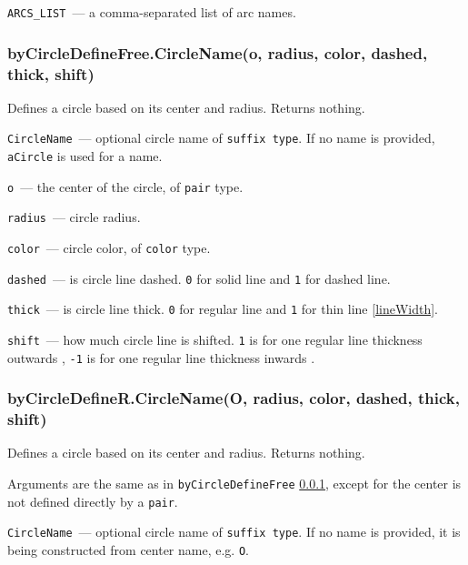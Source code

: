 	\texttt{ARCS\_LIST}~— a comma-separated list of arc names.


\subsubsection{byCircleDefineFree.CircleName(o, radius, color, dashed, thick, shift)}\label{byCircleDefineFree}
	
	Defines a circle based on its center and radius. Returns nothing.
	
	
	\texttt{CircleName}~— optional circle name of \texttt{suffix type}. If no name is provided, \texttt{aCircle} is used for a name.
	
	\texttt{o}~— the center of the circle, of \texttt{pair} type.
	
	\texttt{radius}~— circle radius.
	
	\texttt{color}~— circle color, of \texttt{color} type.
	
	\texttt{dashed}~— is circle line dashed. \texttt{0} for solid line and \texttt{1} for dashed line.
	
	\texttt{thick}~— is circle line thick. \texttt{0} for regular line and \texttt{1} for thin line \ref{lineWidth}.
	
	\texttt{shift}~— how much circle line is shifted. \texttt{1} is for one regular line thickness outwards
	, \texttt{-1} is for one regular line thickness inwards
	.

\subsubsection{byCircleDefineR.CircleName(O, radius, color, dashed, thick, shift)}\label{byCircleDefineR}
	
	Defines a circle based on its center and radius. Returns nothing.
	
	Arguments are the same as in \texttt{byCircleDefineFree} \ref{byCircleDefineFree}, except for the center is not defined directly by a \texttt{pair}.
	
	\texttt{CircleName}~— optional circle name of \texttt{suffix type}. If no name is provided, it is being constructed from center name, e.g. \texttt{O}.
	
